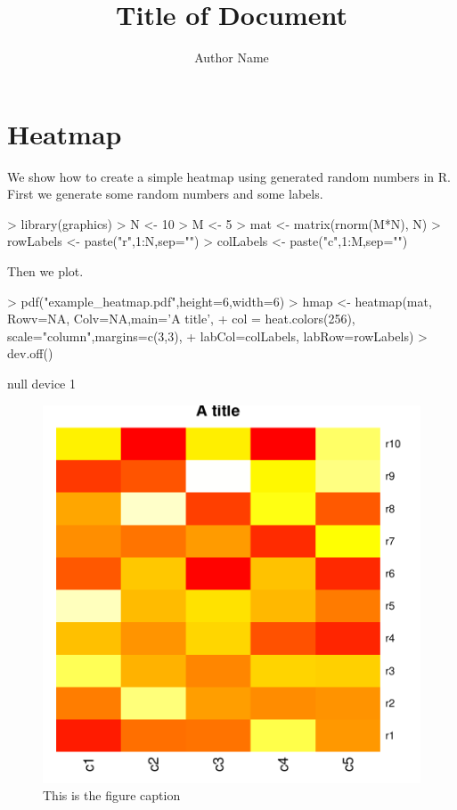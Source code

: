 \documentclass[a4paper]{article}
\title{Title of Document}
\author{Author Name}
\begin{document}

\maketitle
\section{Heatmap}
We show how to create a simple heatmap using generated random numbers
in R. First we generate some random numbers and some labels.

\begin{Schunk}
\begin{Sinput}
> library(graphics)
> N <- 10
> M <- 5
> mat <- matrix(rnorm(M*N), N)
> rowLabels <- paste("r",1:N,sep="")
> colLabels <- paste("c",1:M,sep="")
\end{Sinput}
\end{Schunk}

\noindent Then we plot.
\begin{Schunk}
\begin{Sinput}
> pdf("example_heatmap.pdf",height=6,width=6)
> hmap <- heatmap(mat, Rowv=NA, Colv=NA,main='A title',
+                 col = heat.colors(256), scale="column",margins=c(3,3),
+                 labCol=colLabels, labRow=rowLabels)
> dev.off()
\end{Sinput}
\begin{Soutput}
null device 
          1 
\end{Soutput}
\end{Schunk}

\begin{figure}
\begin{center}
\includegraphics[ext=.pdf,scale = 0.9]{"example_heatmap"}
\end{center}
\caption{This is the figure caption}
\end{figure}
\end{document}
